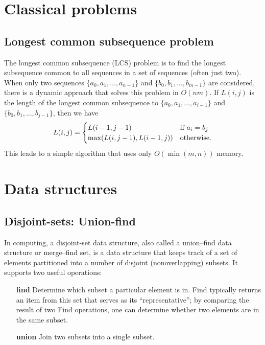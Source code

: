 \documentclass[a4paper, twoside,openany]{book}
\begin{document}
\chapter{Classical problems}
\section{Longest common subsequence problem}
The longest common subsequence (LCS) problem is to find the longest subsequence common to all sequences in a set of sequences (often just two).
When only two sequences $\{ a_0, a_1, \ldots, a_{n-1}\}$ and $\{ b_0, b_1, \ldots, b_{m-1}\}$ are considered, there is a dynamic approach that solves this problem in $O(nm)$.
If $L(i,j)$ is the length of the longest common subsequence to $\{ a_0, a_1, \ldots, a_{i-1}\}$ and $\{ b_0, b_1, \ldots, b_{j-1}\}$, then we have
\begin{equation}
L(i,j) = \begin{cases} L(i-1,j-1) &  \textnormal{if } a_i = b_j\\ \max(L(i,j-1), L(i-1,j)) & \textnormal{otherwise.} \end{cases}
\end{equation}
This leads to a simple algorithm that uses only $O(\min(m,n))$ memory.



\chapter{Data structures}
\section{Disjoint-sets: Union-find}
In computing, a disjoint-set data structure, also called a union–find data structure or merge–find set, is a data structure that keeps track of a set of elements partitioned into a number of disjoint (nonoverlapping) subsets. It supports two useful operations:
\begin{enumerate}
\item[\bf find] Determine which subset a particular element is in. Find typically returns an item from this set that serves as its ``representative''; by comparing the result of two Find operations, one can determine whether two elements are in the same subset.
\item[\bf union] Join two subsets into a single subset.
\end{enumerate}
\end{document}
